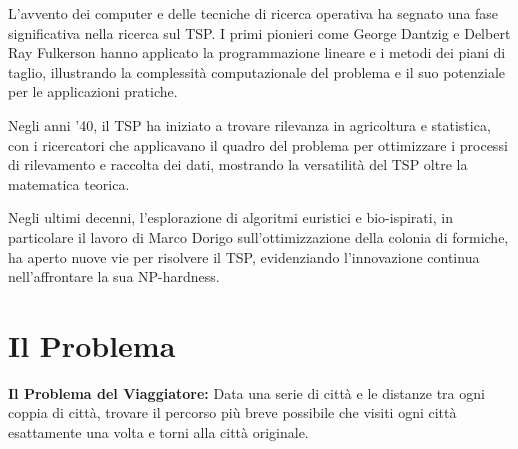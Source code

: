 L'avvento dei computer e delle tecniche di ricerca operativa ha segnato una fase significativa nella ricerca sul \gls{TSP}. I primi pionieri come George Dantzig e Delbert Ray Fulkerson hanno applicato la programmazione lineare e i metodi dei piani di taglio, illustrando la complessità computazionale del problema e il suo potenziale per le applicazioni pratiche.

Negli anni '40, il \gls{TSP} ha iniziato a trovare rilevanza in agricoltura e statistica, con i ricercatori che applicavano il quadro del problema per ottimizzare i processi di rilevamento e raccolta dei dati, mostrando la versatilità del \gls{TSP} oltre la matematica teorica.

Negli ultimi decenni, l'esplorazione di algoritmi euristici e bio-ispirati, in particolare il lavoro di Marco Dorigo sull'ottimizzazione della colonia di formiche, ha aperto nuove vie per risolvere il \gls{TSP}, evidenziando l'innovazione continua nell'affrontare la sua NP-hardness.


\section{Il Problema}

\textbf{Il Problema del Viaggiatore:} Data una serie di città e le distanze tra ogni coppia di città, trovare il percorso più breve possibile che visiti ogni città esattamente una volta e torni alla città originale.



